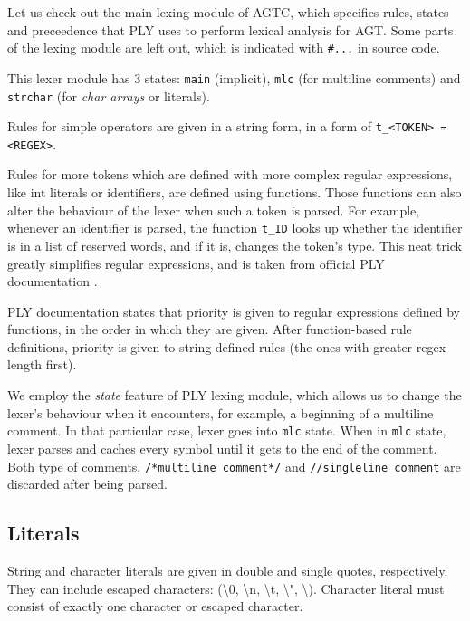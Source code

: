 \documentclass[times, utf8, diplomski]{fer}
\theoremstyle{definition}
\newcommand{\pythoncode}[3]{
    
}
\begin{document}
Let us check out the main lexing module of AGTC, which specifies rules, states and preceedence that
PLY uses to perform lexical analysis for AGT. Some parts of the lexing module
are left out, which is indicated with \texttt{\#...} in source code.

\pythoncode{\resdir/compiler/lexer.py}{}{heyy}

This lexer module has 3 states: \texttt{main} (implicit), \texttt{mlc} (for multiline comments) 
and \texttt{strchar} (for \textit{char arrays} or  literals).

Rules for simple operators are given in a string form, 
in a form of \texttt{t\_<TOKEN> = <REGEX>}.

Rules for more tokens which are defined with more complex regular expressions, 
like int literals or identifiers, are defined using functions. 
Those functions can also alter the behaviour of the
lexer when such a token is parsed. For example, whenever an identifier is parsed,
the function \texttt{t\_ID} looks up whether the identifier is in a list of reserved
words, and if it is, changes the token's type. This neat trick greatly simplifies
regular expressions, and is taken from official PLY documentation \citep{c_ply_docs_beazley}.

PLY documentation states that priority is given to regular expressions defined by functions, 
in the order in which they are given.
After function-based rule definitions, 
priority is given to string defined rules (the ones with greater regex length first).

We employ the \textit{state} feature of PLY lexing module, 
which allows us to change the lexer's behaviour
when it encounters, for example, a beginning of a multiline comment. 
In that particular case, lexer goes into \texttt{mlc} state.
When in \texttt{mlc} state, lexer parses and caches every 
symbol until it gets to the end of the comment. 
Both type of comments, \texttt{/*multiline comment*/} and \texttt{//singleline comment} are discarded
after being parsed.

\subsection{Literals}

String and character literals are given in double and single quotes, respectively.
They can include escaped characters:  (\textbackslash 0, \textbackslash n, \textbackslash t, 
\textbackslash ", \textbackslash \textquotesingle). 
Character literal must consist of exactly one character or escaped character.
\end{document}
